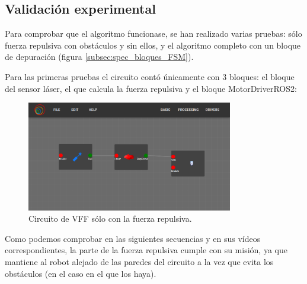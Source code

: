 \subsection{Validación experimental}
\label{subsec:val_exp_VFF}
Para comprobar que el algoritmo funcionase, se han realizado varias pruebas: sólo fuerza repulsiva con obstáculos y sin ellos, y el algoritmo completo con un
bloque de depuración (figura \ref{subsec:spec_bloques_FSM}).

Para las primeras pruebas el circuito contó únicamente con 3 bloques: el bloque del sensor láser, el que calcula la fuerza repulsiva y el bloque MotorDriverROS2:

\begin{figure} [H]
    \begin{center}
        \includegraphics[width=9cm]{figs/c6/VFF_r_Circ.png}
    \end{center}
    \caption[Circuito VFF sólo fuerza repulsiva]{Circuito de VFF sólo con la fuerza repulsiva.}
    \label{fig:VFF_r_circ}
\end{figure}

Como podemos comprobar en las siguientes secuencias y en sus vídeos correspondientes, la parte de la fuerza repulsiva cumple con su misión, ya que mantiene
al robot alejado de las paredes del circuito a la vez que evita los obstáculos (en el caso en el que los haya).

